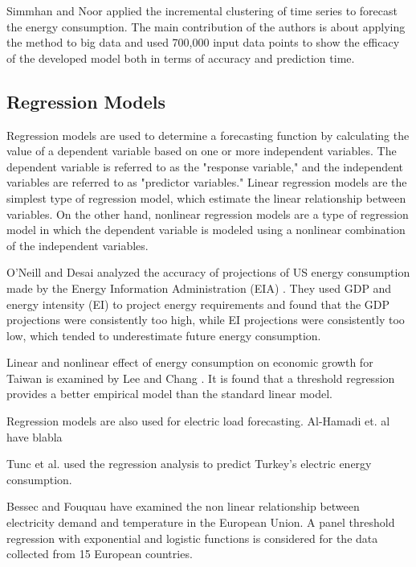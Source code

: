 \documentclass[lettersize,journal]{IEEEtran}
\begin{document}
Simmhan and Noor \cite{time series clustering} applied the incremental clustering of time series to forecast the energy consumption. The main contribution of the authors is about applying the method to big data and used 700,000 input data points to show the efficacy of the developed model both in terms of accuracy and prediction time. 




  \subsection{Regression Models}
  Regression models are used to determine a forecasting function by calculating the value of a dependent variable based on one or more independent variables. The dependent variable is referred to as the "response variable," and the independent variables are referred to as "predictor variables." Linear regression models are the simplest type of regression model, which estimate the linear relationship between variables. On the other hand, nonlinear regression models are a type of regression model in which the dependent variable is modeled using a nonlinear combination of the independent variables.

  O'Neill and Desai analyzed the accuracy of projections of US energy consumption made by the Energy Information Administration (EIA) \cite{O'Neill BC}. They used GDP and energy intensity (EI) to project energy requirements and found that the GDP projections were consistently too high, while EI projections were consistently too low, which tended to underestimate future energy consumption.
  
  
  Linear and nonlinear effect of energy consumption on economic growth for Taiwan is examined by Lee and Chang \cite{Lee CC}. It is found that a threshold regression provides a better empirical model than the standard linear model.

  
  Regression models are also used for electric load forecasting. Al-Hamadi et. al \cite{Al-Hamadi HM} have blabla

  
  Tunc et al. \cite{Tunc}used the regression analysis to predict Turkey's electric energy consumption.

  
  Bessec and Fouquau \cite{Bessec} have examined the non linear relationship between electricity demand and temperature in the European Union. A panel threshold regression with exponential and logistic functions is considered for the data collected from 15 European countries. 
  
\end{document}
